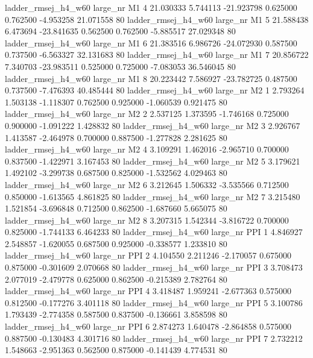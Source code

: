 ladder_rmsej_h4_w60   large_nr       M1                 4 21.030333  5.744113 -21.923798 0.625000 0.762500 -4.953258   21.071558 80
ladder_rmsej_h4_w60   large_nr       M1                 5 21.588438  6.473694 -23.841635 0.562500 0.762500 -5.885517   27.029348 80
ladder_rmsej_h4_w60   large_nr       M1                 6 21.383516  6.986726 -24.072930 0.587500 0.737500 -6.563327   32.131683 80
ladder_rmsej_h4_w60   large_nr       M1                 7 20.856722  7.340703 -23.983511 0.525000 0.725000 -7.083053   36.546045 80
ladder_rmsej_h4_w60   large_nr       M1                 8 20.223442  7.586927 -23.782725 0.487500 0.737500 -7.476393   40.485444 80
ladder_rmsej_h4_w60   large_nr       M2                 1  2.793264  1.503138  -1.118307 0.762500 0.925000 -1.060539    0.921475 80
ladder_rmsej_h4_w60   large_nr       M2                 2  2.537125  1.373595  -1.746168 0.725000 0.900000 -1.091222    1.428832 80
ladder_rmsej_h4_w60   large_nr       M2                 3  2.926767  1.413587  -2.464978 0.700000 0.887500 -1.277828    2.281625 80
ladder_rmsej_h4_w60   large_nr       M2                 4  3.109291  1.462016  -2.965710 0.700000 0.837500 -1.422971    3.167453 80
ladder_rmsej_h4_w60   large_nr       M2                 5  3.179621  1.492102  -3.299738 0.687500 0.825000 -1.532562    4.029463 80
ladder_rmsej_h4_w60   large_nr       M2                 6  3.212645  1.506332  -3.535566 0.712500 0.850000 -1.613565    4.861825 80
ladder_rmsej_h4_w60   large_nr       M2                 7  3.215480  1.521854  -3.696848 0.712500 0.862500 -1.687660    5.665075 80
ladder_rmsej_h4_w60   large_nr       M2                 8  3.207315  1.542344  -3.816722 0.700000 0.825000 -1.744133    6.464233 80
ladder_rmsej_h4_w60   large_nr      PPI                 1  4.846927  2.548857  -1.620055 0.687500 0.925000 -0.338577    1.233810 80
ladder_rmsej_h4_w60   large_nr      PPI                 2  4.104550  2.211246  -2.170057 0.675000 0.875000 -0.301609    2.070668 80
ladder_rmsej_h4_w60   large_nr      PPI                 3  3.708473  2.077019  -2.479778 0.625000 0.862500 -0.215389    2.782764 80
ladder_rmsej_h4_w60   large_nr      PPI                 4  3.418487  1.959241  -2.677363 0.575000 0.812500 -0.177276    3.401118 80
ladder_rmsej_h4_w60   large_nr      PPI                 5  3.100786  1.793439  -2.774358 0.587500 0.837500 -0.136661    3.858598 80
ladder_rmsej_h4_w60   large_nr      PPI                 6  2.874273  1.640478  -2.864858 0.575000 0.887500 -0.130483    4.301716 80
ladder_rmsej_h4_w60   large_nr      PPI                 7  2.732212  1.548663  -2.951363 0.562500 0.875000 -0.141439    4.774531 80
